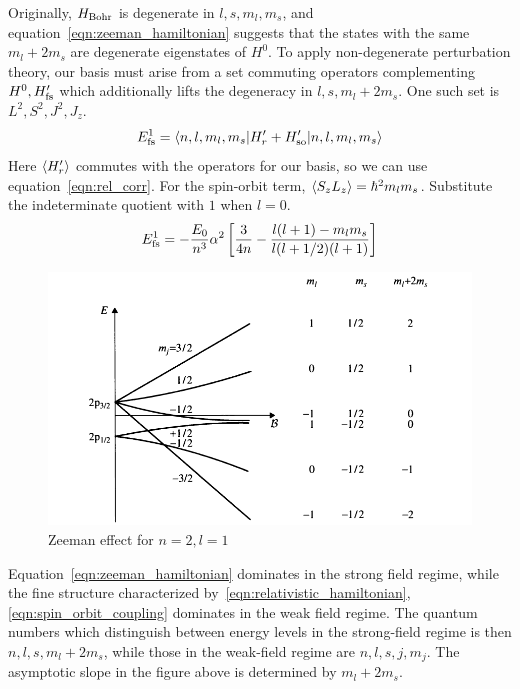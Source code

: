 Originally, $H_{\mathrm{Bohr}}$ is degenerate in 
$l, s, m_l, m_s$, and equation~\ref{eqn:zeeman_hamiltonian} suggests that the 
states with the same $m_l+2m_s$ are degenerate eigenstates of $H^0$. 
To apply non-degenerate perturbation theory, 
our basis must arise from a set commuting operators complementing $H^0, H'_{\mathrm{fs}}$ 
which additionally lifts the degeneracy in $l, s, m_l+2m_s$. 
One such set is $L^2, S^2, J^2, J_z$. 
\begin{equation}
    E^1_{\mathrm{fs}} = \langle n, l, m_l, m_s | H'_r + H'_{\mathrm{so}} | n, l, m_l, m_s\rangle 
\end{equation}
Here $\langle H'_r\rangle$ commutes with the operators for our basis, so we can use equation~\ref{eqn:rel_corr}. 
For the spin-orbit term, $\langle S_zL_z\rangle = \hbar^2m_lm_s$. Substitute the indeterminate quotient 
with $1$ when $l=0$.
\begin{equation}
    E^1_{\mathrm{fs}} = -\dfrac{E_0}{n^3}\alpha^2 \left[\dfrac 3 {4n} - \dfrac{l(l+1) - m_lm_s}{l(l+1/2)(l+1)}\right]
\end{equation}

\begin{figure} %
    \centering
    \includegraphics[width=1\linewidth]{src/zeeman.png}
    \caption{Zeeman effect for $n=2, l=1$}
    \label{fig:zeeman}
\end{figure}

Equation~\ref{eqn:zeeman_hamiltonian} dominates in the strong field regime,
while the fine structure characterized by~\ref{eqn:relativistic_hamiltonian}, 
\ref{eqn:spin_orbit_coupling} dominates in the weak field regime. 
The quantum numbers which distinguish between energy levels
in the strong-field regime is then $n, l, s, m_l+2m_s$, while those in the 
weak-field regime are $n, l, s, j, m_j$. The asymptotic slope in the figure above is 
determined by $m_l+2m_s$. 


